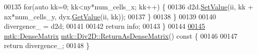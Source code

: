 \begin{DoxyCode}
00135     \textcolor{keywordflow}{for}(\textcolor{keyword}{auto} kk=0; kk<ny*num\_cells\_x; kk++) \{
00136       d2d.\hyperlink{classmtk_1_1DenseMatrix_a784ce5784109ac86bfb9d8562b334b13}{SetValue}(ii, kk + nx*num\_cells\_y, dyx.\hyperlink{classmtk_1_1DenseMatrix_a4b23ecbebd970b5eea915dbb50691024}{GetValue}(ii, kk));
00137     \}
00138   \}
00139 
00140   divergence\_ = d2d;
00141 
00142   \textcolor{keywordflow}{return} info;
00143 \}
00144 
\hypertarget{mtk__div__2d_8cc_source_l00145}{}\hyperlink{classmtk_1_1Div2D_ae4f880fb28ad2379906e9ac0dfaa4458}{00145} \hyperlink{classmtk_1_1DenseMatrix}{mtk::DenseMatrix} \hyperlink{classmtk_1_1Div2D_ae4f880fb28ad2379906e9ac0dfaa4458}{mtk::Div2D::ReturnAsDenseMatrix}()\textcolor{keyword}{ const }\{
00146 
00147   \textcolor{keywordflow}{return} divergence\_;
00148 \}
\end{DoxyCode}
